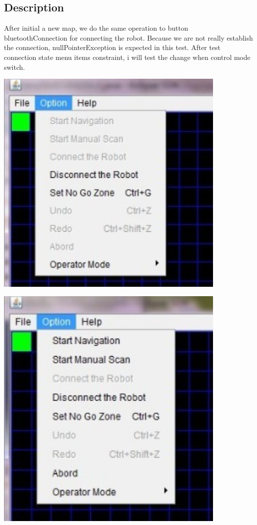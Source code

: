 \documentclass[11pt, a4paper]{report}
\begin{document}
\subsection{Description}
After initial a new map, we do the same operation to button bluetoothConnection for connecting the robot. Because we are not really establish the connection, nullPointerException is expected in this test. After test connection state menu items constraint, i will test the change when control mode switch.
 \begin{center}
  \includegraphics[width=11.20cm]{OptionMenuConnection}
  \end{center}
  \begin{center}
 \includegraphics[width=11.20cm]{AutoModeMenu}
 \end{center}
\end{document}
